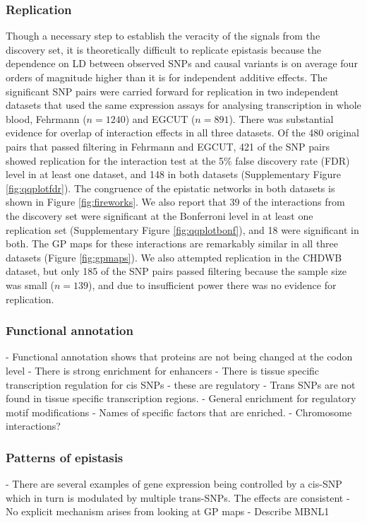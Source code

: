 \documentclass{article}
\begin{document}
\subsubsection{Replication}
Though a necessary step to establish the veracity of the signals from the discovery set, it is theoretically difficult to replicate epistasis because the dependence on LD between observed SNPs and causal variants is on average four orders of magnitude higher than it is for independent additive effects. The significant SNP pairs were carried forward for replication in two independent datasets that used the same expression assays for analysing transcription in whole blood, Fehrmann ($n=1240$) and EGCUT ($n=891$). There was substantial evidence for overlap of interaction effects in all three datasets. Of the 480 original pairs that passed filtering in Fehrmann and EGCUT, 421 of the SNP pairs showed replication for the interaction test at the 5\% false discovery rate (FDR) level in at least one dataset, and 148 in both datasets (Supplementary Figure \ref{fig:qqplotfdr}). The congruence of the epistatic networks in both datasets is shown in Figure \ref{fig:fireworks}. We also report that 39 of the interactions from the discovery set were significant at the Bonferroni level in at least one replication set (Supplementary Figure \ref{fig:qqplotbonf}), and 18 were significant in both. The GP maps for these interactions are remarkably similar in all three datasets (Figure \ref{fig:gpmaps}). We also attempted replication in the CHDWB dataset, but only 185 of the SNP pairs passed filtering because the sample size was small ($n=139$), and due to insufficient power there was no evidence for replication.


\subsubsection{Functional annotation}
- Functional annotation shows that proteins are not being changed at the codon level
- There is strong enrichment for enhancers
- There is tissue specific transcription regulation for cis SNPs - these are regulatory
- Trans SNPs are not found in tissue specific transcription regions.
- General enrichment for regulatory motif modifications
- Names of specific factors that are enriched.
- Chromosome interactions?


\subsubsection{Patterns of epistasis}
- There are several examples of gene expression being controlled by a cis-SNP which in turn is modulated by multiple trans-SNPs. The effects are consistent 
- No explicit mechanism arises from looking at GP maps
- Describe MBNL1
\end{document}
